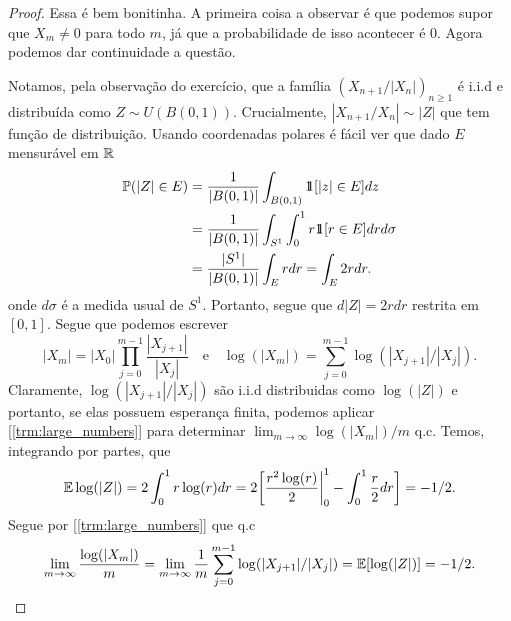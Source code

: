 \begin{proof}
	Essa é bem bonitinha. A primeira coisa a observar é que podemos
	supor que $X_m \neq 0$ para todo $m$, já que a probabilidade de isso
	acontecer é $0$. Agora
	podemos dar continuidade a questão.

	Notamos, pela observação do exercício, que a família
	$(X_{n+1}/|X_n|)_{n\geq1}$ é i.i.d e distribuída como $Z \sim U(B(0,
	1))$. Crucialmente,
	$|X_{n+1}/X_n| \sim |Z|$ que tem função de distribuição. Usando
	coordenadas polares é fácil ver que dado $E$ mensurável em $\mathbb{R}$
	\begin{align*}
		\mathbb{P}(|Z| \in E) &= \frac{1}{|B(0,1)|}\int_{B(0,1)} \hbox{$1\mkern-6.5mu1$}[|z| \in E]dz\\
		&=\frac{1}{|B(0,1)|}\int_{S^1} \int_0^1 r \hbox{$1\mkern-6.5mu1$}[r \in E] dr d\sigma\\
		&=\frac{|S^1|}{|B(0,1)|}\int_E r dr = \int_E 2r dr.
	\end{align*}
	onde $d\sigma$ é a medida usual de $S^1$. Portanto, segue que $d|Z|
	= 2rdr$ restrita em $[0,1]$. Segue que podemos escrever
	\[
		|X_m| = |X_0| \prod_{j = 0}^{m-1} \frac{|X_{j+1}|}{|X_j|} \quad
		\text{e} \quad \log(|X_m|) = \sum_{j = 0}^{m-1} \log(|X_{j+1}|/|X_j|).
	\]
	Claramente, $\log(|X_{j+1}|/|X_j|)$ são i.i.d distribuidas como
	$\log(|Z|)$ e portanto, se elas possuem esperança finita, podemos
	aplicar [\ref{trm:large_numbers}] para determinar
	$\lim_{m\to\infty} \log(|X_m|)/m$ q.c. Temos, integrando por partes, que
	\[
		\mathbb{E} \log(|Z|) = 2\int_{0}^1 r\log (r)dr = 2\bigg[
		\frac{r^2\log(r)}{2}\bigg|_0^1 - \int_0^1 \frac{r}{2}dr\bigg] = -1/2.
	\]
	Segue por [\ref{trm:large_numbers}] que q.c
	\[
		\lim_{m\rightarrow\infty} \frac{\log(|X_m|)}{m} = \lim_{m \rightarrow \infty}
		\frac{1}{m}\sum_{j = 0}^{m-1} \log(|X_{j+1}|/|X_j|) = \mathbb{E}[\log(|Z|)] = -1/2.
	\]
\end{proof}

